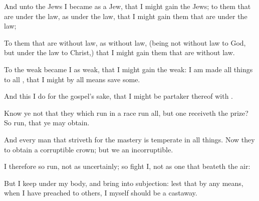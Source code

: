 {And unto the
Jews I
became
as a
Jew,
that I might
gain the
Jews; to them that
are
under the
law,
as
under the
law,
that I might
gain them that
are
under the
law;

To them that are without
law,
as without
law, (being
not without
law to
God,
but under the
law to
Christ,)
that I might
gain them that are without
law.

To the
weak became
I
as
weak,
that I might
gain the
weak: I am
made all
things to
all
{},
that I
might by all
means
save
some.

And
this I
do
for the
gospel’s sake,
that I might
be
partaker thereof
with
{}.

Know
ye
not
that they
which
run
in a
race
run
all,
but
one
receiveth the
prize?
So
run,
that ye may
obtain.

And every
man that striveth for the
mastery is
temperate in all
things.
Now
they
{}
to
obtain a
corruptible
crown;
but
we an
incorruptible.

I
therefore
so
run,
not
as
uncertainly;
so fight
I,
not
as one that
beateth the
air:

But I keep
under
my
body,
and
bring
{} into
subjection: lest that by any
means, when I have
preached to
others, I
myself should
be a
castaway.




\par }
